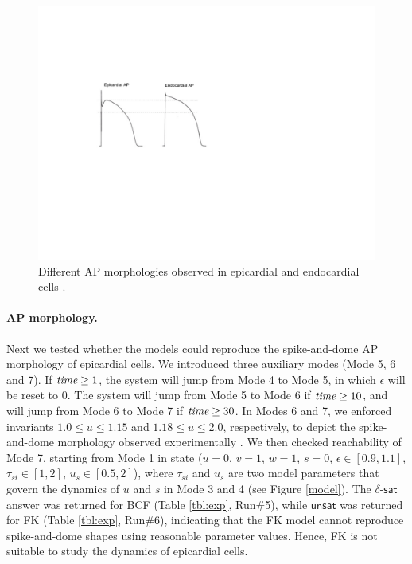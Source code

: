 \begin{figure}[th]
\centering
\includegraphics[scale=0.8]{fig-ap}
\caption{Different AP morphologies observed in epicardial and endocardial cells \cite{nabauer96}.}
\label{ap}
\end{figure}

\paragraph{AP morphology.}
Next we tested whether the models could reproduce the spike-and-dome AP morphology of epicardial cells. We introduced three auxiliary modes (Mode 5, 6 and 7). If $\text{\em time} \ge 1$, the system will jump from Mode 4 to Mode 5, in which $\epsilon$ will be reset to $0$. The system will jump from Mode 5 to Mode 6 if $\text{\em time} \ge 10$, and will jump from Mode 6 to Mode 7 if $\text{\em time} \ge 30$. In Modes 6 and 7, we enforced invariants $1.0 \le u \le 1.15$ and $1.18 \le u \le 2.0$, respectively, to depict the spike-and-dome morphology observed experimentally \cite{nabauer96}. We then checked reachability of Mode 7, starting from Mode 1 in state ($u = 0$, $v = 1$, $w = 1$, $s = 0$, $\epsilon \in [0.9,1.1]$, $\tau_{si} \in [1,2]$, $u_s \in [0.5,2]$),
where $\tau_{si}$ and $u_s$ are two model parameters that govern the dynamics of $u$ and $s$ in
Mode 3 and 4 (see Figure \ref{model}).
The $\delta$-$\mathsf{sat}$ answer
was returned for BCF  (Table \ref{tbl:exp}, Run\#5), while $\mathsf{unsat}$ was returned for FK (Table \ref{tbl:exp}, Run\#6), indicating that the FK model cannot reproduce spike-and-dome shapes using reasonable parameter values. Hence, FK is not suitable to study the dynamics of epicardial cells.

